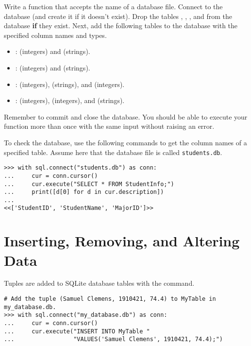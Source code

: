 \begin{problem} %
Write a function that accepts the name of a database file.
Connect to the database (and create it if it doesn't exist).
Drop the tables , , , and  from the database \textbf{if} they exist.
Next, add the following tables to the database with the specified column names and types.
\begin{itemize}
\item {}:  (integers) and  (strings).
\item {}:  (integers) and  (strings).
\item {}:  (integers),  (strings), and  (integers).
\item {}:  (integers),  (integers), and  (strings).
\end{itemize}
Remember to commit and close the database.
You should be able to execute your function more than once with the same input without raising an error.

To check the database, use the following commands to get the column names of a specified table.
Assume here that the database file is called \texttt{students.db}.

\begin{lstlisting}
>>> with sql.connect("students.db") as conn:
...     cur = conn.cursor()
...     cur.execute("SELECT * FROM StudentInfo;")
...     print([d[0] for d in cur.description])
...
<<['StudentID', 'StudentName', 'MajorID']>>
\end{lstlisting}
\label{prob:sql1-create-student-tables}
\end{problem}

\section*{Inserting, Removing, and Altering Data} %

Tuples are added to SQLite database tables with the  command.

\begin{lstlisting}
# Add the tuple (Samuel Clemens, 1910421, 74.4) to MyTable in my_database.db.
>>> with sql.connect("my_database.db") as conn:
...     cur = conn.cursor()
...     cur.execute("INSERT INTO MyTable "
...                 "VALUES('Samuel Clemens', 1910421, 74.4);")
\end{lstlisting}

